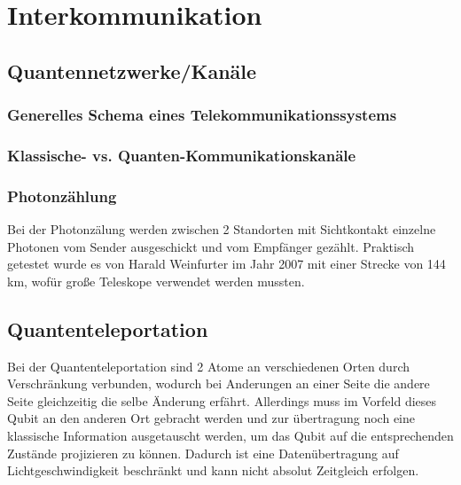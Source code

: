 \section{Interkommunikation}
\label{sec:Interkommunikation}


\subsection{Quantennetzwerke/Kanäle}
\label{sec:Quantennetzwerke/Kanale}

\subsubsection{Generelles Schema eines Telekommunikationssystems}

\subsubsection{Klassische- vs. Quanten-Kommunikationskanäle}

\subsubsection{Photonzählung}

Bei der Photonzälung werden zwischen 2 Standorten mit Sichtkontakt einzelne Photonen vom Sender ausgeschickt und vom Empfänger gezählt. Praktisch getestet wurde es von Harald Weinfurter im Jahr 2007 mit einer Strecke von 144 km, wofür große Teleskope verwendet werden mussten.

\subsection{Quantenteleportation}
\label{sec:Quantenteleportation}

Bei der Quantenteleportation sind 2 Atome an verschiedenen Orten durch Verschränkung verbunden, wodurch bei Anderungen an einer Seite die andere Seite gleichzeitig die selbe Änderung erfährt. Allerdings muss im Vorfeld dieses Qubit an den anderen Ort gebracht werden und zur übertragung noch eine klassische Information ausgetauscht werden, um das Qubit auf die entsprechenden Zustände projizieren zu können. Dadurch ist eine Datenübertragung auf Lichtgeschwindigkeit beschränkt und kann nicht absolut Zeitgleich erfolgen.




